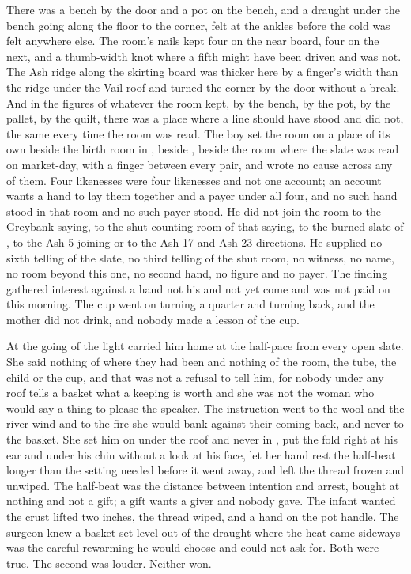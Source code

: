 There was a bench by the door and a pot on the bench, and a draught under the bench going along the floor to the corner, felt at the ankles before the cold was felt anywhere else. The room's nails kept four on the near board, four on the next, and a thumb-width knot where a fifth might have been driven and was not. The Ash ridge along the skirting board was thicker here by a finger's width than the ridge under the Vail roof and turned the corner by the door without a break. And in the figures of whatever the room kept, by the bench, by the pot, by the pallet, by the quilt, there was a place where a line should have stood and did not, the same every time the room was read. The boy set the room on a place of its own beside the birth room in , beside , beside the room where the slate was read on market-day, with a finger between every pair, and wrote no cause across any of them. Four likenesses were four likenesses and not one account; an account wants a hand to lay them together and a payer under all four, and no such hand stood in that room and no such payer stood. He did not join the room to the Greybank saying, to the shut counting room of that saying, to the burned slate of , to the Ash 5 joining or to the Ash 17 and Ash 23 directions. He supplied no sixth telling of the slate, no third telling of the shut room, no witness, no name, no room beyond this one, no second hand, no figure and no payer. The finding gathered interest against a hand not his and not yet come and was not paid on this morning. The cup went on turning a quarter and turning back, and the mother did not drink, and nobody made a lesson of the cup.

\scenebreak

At the going of the light  carried him home at the half-pace from every open slate. She said nothing of where they had been and nothing of the room, the tube, the child or the cup, and that was not a refusal to tell him, for nobody under any roof tells a basket what a keeping is worth and she was not the woman who would say a thing to please the speaker. The instruction went to the wool and the river wind and to the fire she would bank against their coming back, and never to the basket. She set him on  under the roof and never in , put the fold right at his ear and under his chin without a look at his face, let her hand rest the half-beat longer than the setting needed before it went away, and left the thread frozen and unwiped. The half-beat was the distance between intention and arrest, bought at nothing and not a gift; a gift wants a giver and nobody gave. The infant wanted the crust lifted two inches, the thread wiped, and a hand on the pot handle. The surgeon knew a basket set level out of the draught where the heat came sideways was the careful rewarming he would choose and could not ask for. Both were true. The second was louder. Neither won.

